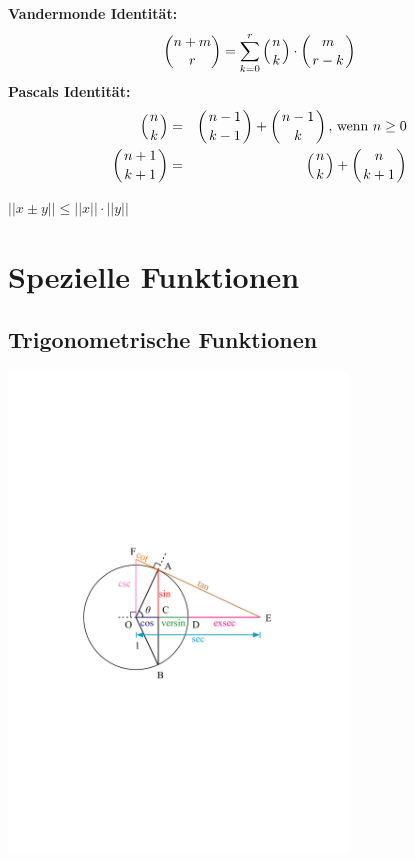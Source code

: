 \documentclass[a4paper]{article}
\begin{document}
\begin{appendix}
\begin{multicols}{2}
\begin{fdef}[Binomialkoeffizient]
				\textbf{Vandermonde Identität:} 
					$$\binom{n+m}{r}=\sum_{k=0}^{r}\left({n\atop k}\right)\cdot\left({m\atop r-k}\right)$$ 
				\textbf{Pascals Identität:}
					\begin{eqnarray*}
						\left({n\atop k}\right) &=& \left({n-1\atop k-1}\right)+\left({n-1\atop k}\right)\text{, wenn }n\geq0 \\
						\left({n+1\atop k+1}\right) &=& \left({n\atop k}\right)+\left({n\atop k+1}\right)
					\end{eqnarray*}
				
			\end{fdef}
		
			\begin{fmerke}[Dreiecksungleichung]
				$||x \pm y|| \le ||x|| \cdot ||y||$\\
			\end{fmerke}
	\end{multicols}

	\section{Spezielle Funktionen}
		\begin{multicols}{2}
		\subsection{Trigonometrische Funktionen}
			\includegraphics[width=9cm]{einheitskreis.pdf}
			

\end{multicols}
\end{appendix}
\end{document}
